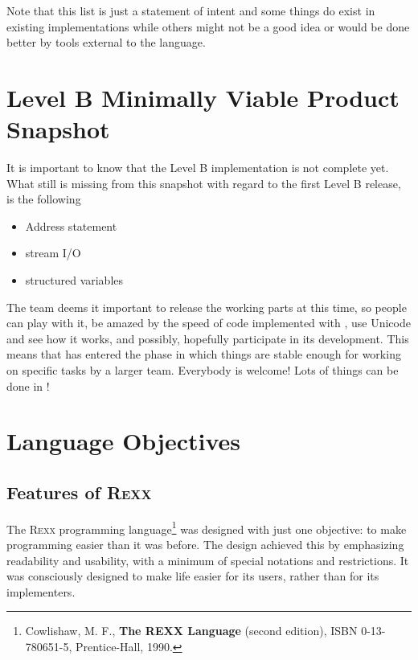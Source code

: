 Note that this list is just a statement of intent and some things
do exist in existing implementations while others might not be a
good idea or would be done better by tools external to the language.
  
\section{Level B Minimally Viable Product Snapshot}
It is important to know that the Level B implementation is not complete
yet. What still is missing from this snapshot with
regard to the first \crexx{} Level B release, is the following
\begin{itemize}
\item Address statement
\item stream I/O
\item structured variables
\end{itemize}

The team deems it important to release the working parts at this time,
so people can play with it, be amazed by the speed of code implemented
with \rexx{}, use Unicode and see how it works, and possibly,
hopefully participate in its development. This means that \crexx{} has
entered the phase in which things are stable enough for working on
specific tasks by a larger team. Everybody is welcome! Lots of things
can be done in \rexx{}!

\section{Language Objectives}
\subsection{Features of R\textsc{exx}}
The R\textsc{exx} programming language\footnote{Cowlishaw, M. F., \textbf{The REXX Language} (second edition), ISBN 0-13-780651-5, Prentice-Hall, 1990.} was designed with just one objective: to make programming easier than it was before. The design achieved this by emphasizing readability and usability, with a minimum of special notations and restrictions. It was consciously designed to make life easier for its users, rather than for its implementers.

